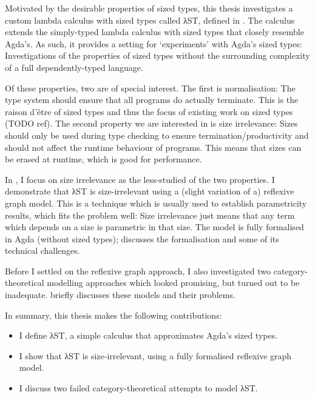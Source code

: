Motivated by the desirable properties of sized types, this thesis investigates a
custom lambda calculus with sized types called λST, defined in .
The calculus extends the simply-typed lambda calculus with sized types that
closely resemble Agda's. As such, it provides a setting for
\enquote*{experiments} with Agda's sized types: Investigations of the properties
of sized types without the surrounding complexity of a full dependently-typed
language.

Of these properties, two are of special interest. The first is normalisation:
The type system should ensure that all programs do actually terminate. This is
the raison d'être of sized types and thus the focus of existing work on sized
types (TODO ref). The second property we are interested in is size irrelevance:
Sizes should only be used during type checking to ensure
termination/productivity and should not affect the runtime behaviour of
programs. This means that sizes can be erased at runtime, which is good for
performance.

In , I focus on size irrelevance as the less-studied of the two
properties. I demonstrate that λST is size-irrelevant using a (slight variation
of a) reflexive graph model. This is a technique which is usually used to
establish parametricity results, which fits the problem well: Size irrelevance
just means that any term which depends on a size is parametric in that size. The
model is fully formalised in Agda (without sized types); 
discusses the formalisation and some of its technical challenges.

Before I settled on the reflexive graph approach, I also investigated two
category-theoretical modelling approaches which looked promising, but turned out
to be inadequate.  briefly discusses these models and their
problems.

In summary, this thesis makes the following contributions:

\begin{itemize}
\item I define λST, a simple calculus that approximates Agda's sized types.
\item I show that λST is size-irrelevant, using a fully formalised reflexive
  graph model.
\item I discuss two failed category-theoretical attempts to model λST.
\end{itemize}

